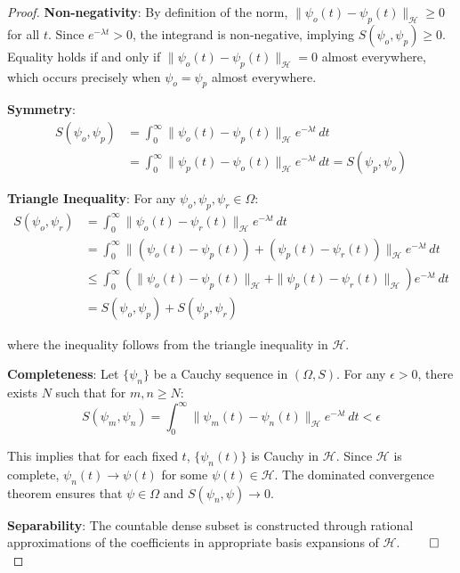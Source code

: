 \documentclass[11pt]{article}
\theoremstyle{definition}
\theoremstyle{remark}
\newcommand{\Hilbert}{\mathcal{H}}
\begin{document}
\begin{proof}
\textbf{Non-negativity}: By definition of the norm, $\|\psi_o(t) - \psi_p(t)\|_{\Hilbert} \geq 0$ for all $t$. Since $e^{-\lambda t} > 0$, the integrand is non-negative, implying $S(\psi_o, \psi_p) \geq 0$. Equality holds if and only if $\|\psi_o(t) - \psi_p(t)\|_{\Hilbert} = 0$ almost everywhere, which occurs precisely when $\psi_o = \psi_p$ almost everywhere.

\textbf{Symmetry}: 
\begin{align}
S(\psi_o, \psi_p) &= \int_0^{\infty} \|\psi_o(t) - \psi_p(t)\|_{\Hilbert} e^{-\lambda t} \, dt \\
&= \int_0^{\infty} \|\psi_p(t) - \psi_o(t)\|_{\Hilbert} e^{-\lambda t} \, dt = S(\psi_p, \psi_o)
\end{align}

\textbf{Triangle Inequality}: For any $\psi_o, \psi_p, \psi_r \in \Omega$:
\begin{align}
S(\psi_o, \psi_r) &= \int_0^{\infty} \|\psi_o(t) - \psi_r(t)\|_{\Hilbert} e^{-\lambda t} \, dt \\
&= \int_0^{\infty} \|(\psi_o(t) - \psi_p(t)) + (\psi_p(t) - \psi_r(t))\|_{\Hilbert} e^{-\lambda t} \, dt \\
&\leq \int_0^{\infty} \left(\|\psi_o(t) - \psi_p(t)\|_{\Hilbert} + \|\psi_p(t) - \psi_r(t)\|_{\Hilbert}\right) e^{-\lambda t} \, dt \\
&= S(\psi_o, \psi_p) + S(\psi_p, \psi_r)
\end{align}

where the inequality follows from the triangle inequality in $\Hilbert$.

\textbf{Completeness}: Let $\{\psi_n\}$ be a Cauchy sequence in $(\Omega, S)$. For any $\epsilon > 0$, there exists $N$ such that for $m, n \geq N$:
\begin{equation}
S(\psi_m, \psi_n) = \int_0^{\infty} \|\psi_m(t) - \psi_n(t)\|_{\Hilbert} e^{-\lambda t} \, dt < \epsilon
\end{equation}

This implies that for each fixed $t$, $\{\psi_n(t)\}$ is Cauchy in $\Hilbert$. Since $\Hilbert$ is complete, $\psi_n(t) \to \psi(t)$ for some $\psi(t) \in \Hilbert$. The dominated convergence theorem ensures that $\psi \in \Omega$ and $S(\psi_n, \psi) \to 0$.

\textbf{Separability}: The countable dense subset is constructed through rational approximations of the coefficients in appropriate basis expansions of $\Hilbert$. $\qed$
\end{proof}
\end{document}
